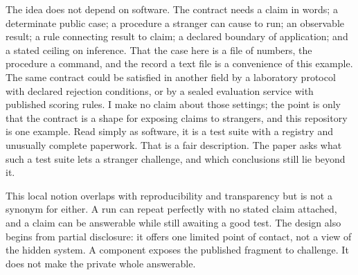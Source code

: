 \documentclass[11pt]{article}
\begin{document}
The idea does not depend on software. The contract needs a claim in words; a
determinate public case; a procedure a stranger can
cause to run; an observable result; a rule connecting result to claim; a
declared boundary of application; and a stated ceiling on inference. That
the case here is a file of numbers, the procedure a command, and the record a
text file is a convenience of this example. The same contract could be
satisfied in another field by a laboratory protocol with declared rejection
conditions, or by a sealed evaluation service with published scoring rules.
I make no claim about those settings; the point is only that the contract
is a shape for exposing claims to strangers, and this repository is one
example. Read simply as software, it is a test suite with a registry and
unusually complete paperwork. That is a fair description. The paper asks
what such a test suite lets a stranger challenge, and which conclusions
still lie beyond it.

This local notion overlaps with reproducibility and transparency but is not
a synonym for either. A run can repeat perfectly with no stated claim attached,
and a claim can be answerable while still awaiting a good test. The design
also begins from partial disclosure: it offers one limited point of contact,
not a view of the hidden system. A component exposes the published fragment
to challenge. It does not make the private whole answerable.
\end{document}
